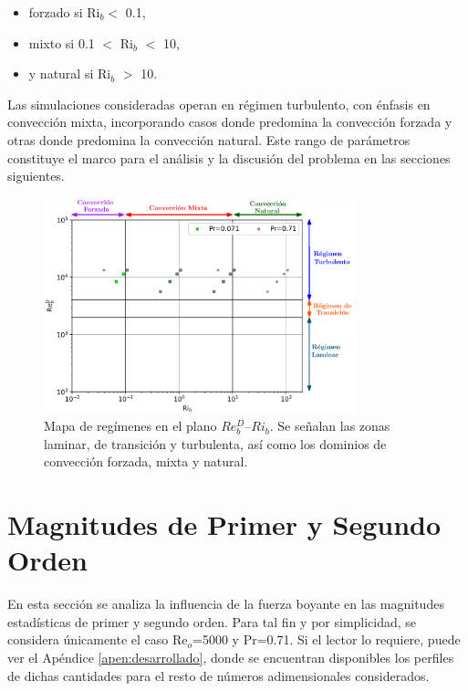 \begin{itemize}
	\item forzado si Ri$_b<$ 0.1,
	\item mixto si 0.1 $<$ Ri$_b$ $<$ 10,
	\item y natural si Ri$_b$ $>$ 10.
\end{itemize}

Las simulaciones consideradas operan en régimen turbulento, con énfasis en convección mixta, incorporando casos donde predomina la convección forzada y otras donde predomina la convección natural. Este rango de parámetros constituye el marco para el análisis y la discusión del problema en las secciones siguientes.

\newpage

\begin{figure}[H]
  \centering
    \includegraphics[width=0.8\textwidth]{figures/cap5/map.eps}
  \caption{Mapa de regímenes en el plano $Re^D_b$–$Ri_b$. Se señalan las zonas laminar, de transición y turbulenta, así como los dominios de convección forzada, mixta y natural.}
  \label{fig:map_flow_regime}
\end{figure}

\section{Magnitudes de Primer y Segundo Orden}

En esta sección se analiza la influencia de la fuerza boyante en las magnitudes estadísticas de primer y segundo orden. Para tal fin y por simplicidad, se considera únicamente el caso Re$_o$=5000 y Pr=0.71. Si el lector lo requiere, puede ver el Apéndice \ref{apen:desarrollado}, donde se encuentran disponibles los perfiles de dichas cantidades para el resto de números adimensionales considerados.

